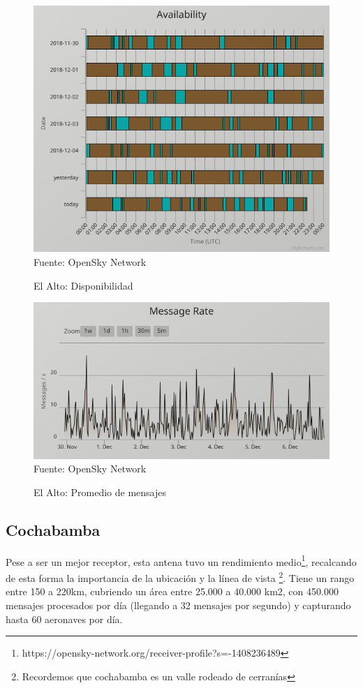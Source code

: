 \documentclass[fleqn,10pt]{SelfArx} %
\begin{document}
\begin{figure}[ht]
\caption{El Alto: Disponibilidad}
\centering
\includegraphics[width=0.8\linewidth]{lpb_disp.png}
\newline Fuente: OpenSky Network
\label{fig:lpb_disp}
\end{figure}

\begin{figure}[ht]
\caption{El Alto: Promedio de mensajes}
\centering
\includegraphics[width=0.8\linewidth]{lpb_mes.png}
\newline Fuente: OpenSky Network
\label{fig:lpb_mes}
\end{figure}

\subsection*{Cochabamba}

Pese a ser un mejor receptor, esta antena tuvo un rendimiento medio\footnote{https://opensky-network.org/receiver-profile?s=-1408236489}, recalcando de esta forma la importancia de la ubicación y la línea de vista \footnote{Recordemos que cochabamba es un valle rodeado de cerranías}. Tiene un rango entre 150 a 220km, cubriendo un área entre 25.000 a 40.000 km2, con 450.000 mensajes procesados por día (llegando a 32 mensajes por segundo) y capturando hasta 60 aeronaves por día.
\end{document}
